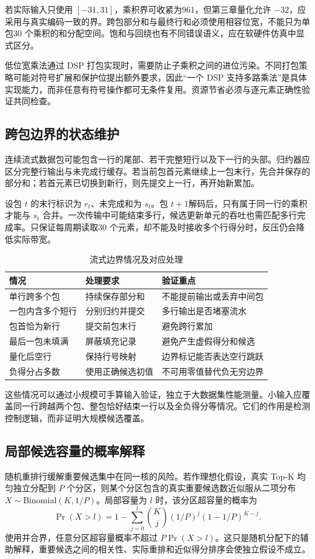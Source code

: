 若实际输入只使用 $[-31,31]$，乘积界可收紧为961，但第三章量化允许 $-32$，应采用与真实编码一致的界。跨包部分和与最终行和必须使用相容位宽，不能只为单包30 个乘积的和分配空间。饱和与回绕也有不同错误语义，应在软硬件仿真中显式区分。

低位宽乘法通过 DSP 打包实现时，需要防止子乘积之间的进位污染。不同打包策略可能对符号扩展和保护位提出额外要求，因此“一个 DSP 支持多路乘法”是具体实现能力，而非任意有符号操作都可无条件复用。资源节省必须与逐元素正确性验证共同检查。

\subsection{跨包边界的状态维护}
连续流式数据包可能包含一行的尾部、若干完整短行以及下一行的头部。归约器应区分完整行输出与未完成行缓存。若当前包首元素继续上一包末行，先合并保存的部分和；若首元素已切换到新行，则先提交上一行，再开始新累加。

设包 $t$ 的末行标识为 $r_t$、未完成和为 $s_t$。包 $t+1$解码后，只有属于同一行的乘积才能与 $s_t$ 合并。一次传输中可能结束多行，候选更新单元的吞吐也需匹配多行完成率。只保证每周期读取30 个元素，却不能及时接收多个行得分时，反压仍会降低实际带宽。

\begin{table}[htbp]\centering\caption{流式边界情况及对应处理}
\begin{tabularx}{\textwidth}{p{3cm}XX}\toprule
情况&处理要求&验证重点\\\midrule
单行跨多个包&持续保存部分和&不能提前输出或丢弃中间包\\
一包内含多个短行&分别归约并提交&多行输出是否堵塞流水\\
包首恰为新行&提交前包末行&避免跨行累加\\
最后一包未填满&屏蔽填充记录&避免产生虚假得分和候选\\
量化后空行&保持行号映射&边界标记能否表达空行跳跃\\
负得分占多数&使用正确候选初值&不可用零值替代负无穷边界\\\bottomrule
\end{tabularx}\end{table}

这些情况可以通过小规模可手算输入验证，独立于大数据集性能测量。小输入应覆盖同一行跨越两个包、整包恰好结束一行以及全负得分等情况。它们的作用是检测控制逻辑，而非证明大规模候选覆盖。

\subsection{局部候选容量的概率解释}
随机重排行缓解重要候选集中在同一核的风险。若作理想化假设，真实 Top-K 均匀独立分配到 $P$ 个分区，则某个分区包含的真实重要候选数近似服从二项分布 $X\sim\mathrm{Binomial}(K,1/P)$。局部容量为 $l$ 时，该分区超容量的概率为
\begin{equation}
 \Pr(X>l)=1-\sum_{j=0}^{l}{K\choose j}(1/P)^j(1-1/P)^{K-j}.
\end{equation}
使用并合界，任意分区超容量概率不超过 $P\Pr(X>l)$。这只是随机分配下的辅助解释，重要候选之间的相关性、实际重排和近似得分排序会使独立假设不成立。


